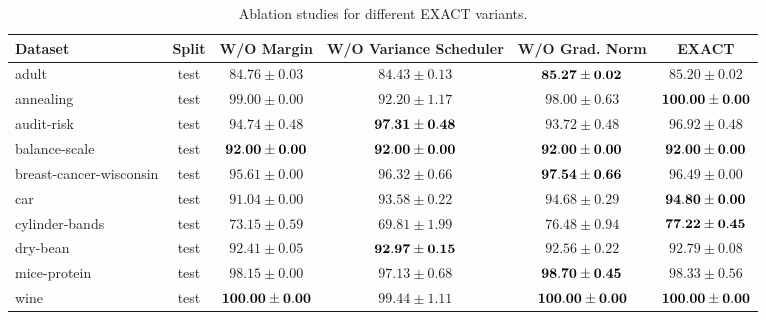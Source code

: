 \documentclass[nohyperref]{article}
\theoremstyle{plain}
\theoremstyle{definition}
\theoremstyle{remark}
\begin{document}
\begin{table*}[t]
\centering
\begin{tabular}{lc|ccc|c}
Dataset & Split & W/O Margin & W/O Variance Scheduler & W/O Grad. Norm & EXACT \\
\hline

 adult                   & test & $84.76 \pm 0.03$      & $84.43 \pm 0.13$     & $\bf 85.27 \pm 0.02$      & $85.20 \pm 0.02$      \\
 annealing               & test & $99.00 \pm 0.00$      & $92.20 \pm 1.17$     & $98.00 \pm 0.63$      & $\bf 100.00 \pm 0.00$ \\
 audit-risk              & test & $94.74 \pm 0.48$      & $\bf 97.31 \pm 0.48$     & $93.72 \pm 0.48$      & $96.92 \pm 0.48$      \\
 balance-scale           & test & $\bf 92.00 \pm 0.00$  & $\bf 92.00 \pm 0.00$ & $\bf 92.00 \pm 0.00$  & $\bf 92.00 \pm 0.00$  \\
 breast-cancer-wisconsin & test & $95.61 \pm 0.00$      & $96.32 \pm 0.66$     & $\bf 97.54 \pm 0.66$  & $96.49 \pm 0.00$  \\
 car                     & test & $91.04 \pm 0.00$      & $93.58 \pm 0.22$ & $94.68 \pm 0.29$  & $\bf 94.80 \pm 0.00$  \\
 cylinder-bands          & test & $73.15 \pm 0.59$      & $69.81 \pm 1.99$     & $76.48 \pm 0.94$  & $\bf 77.22 \pm 0.45$  \\
 dry-bean                & test & $92.41 \pm 0.05$      & $\bf 92.97 \pm 0.15$     & $92.56 \pm 0.22$      & $92.79 \pm 0.08$      \\
 mice-protein            & test & $98.15 \pm 0.00$      & $97.13 \pm 0.68$     & $\bf 98.70 \pm 0.45$      & $98.33 \pm 0.56$      \\
 wine                    & test & $\bf 100.00 \pm 0.00$ & $99.44 \pm 1.11$     & $\bf 100.00 \pm 0.00$ & $\bf 100.00 \pm 0.00$ \\

\end{tabular}

\caption{Ablation studies for different EXACT variants.}
\label{tab:ablations}
\end{table*}
\end{document}
